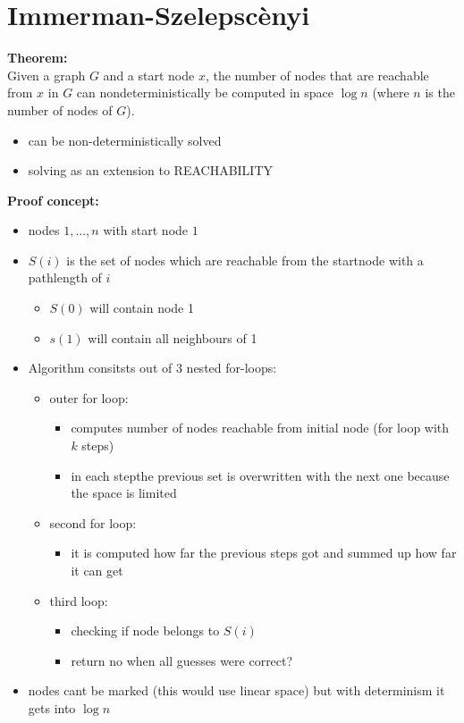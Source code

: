 \documentclass[a4]{scrartcl}
\begin{document}
\section*{Immerman-Szelepscènyi}

\textbf{Theorem:} \\
Given a graph $G$ and a start node $x$, the number of nodes that are reachable from $x$ in $G$ can nondeterministically be computed in space
$\log n$ (where $n$ is the number of nodes of $G$).



\begin{itemize}
\item can be non-deterministically solved
\item solving as an extension to REACHABILITY
\end{itemize}

\textbf{Proof concept:}
\begin{itemize}
\item nodes $1,...,n$ with start node $1$
\item $S(i)$ is the set of nodes which are reachable from the startnode with a pathlength of $i$
\begin{itemize}
\item $S(0)$ will contain node 1
\item $s(1)$ will contain all neighbours of 1
\end{itemize}

\item Algorithm consitsts out of 3 nested for-loops:

\begin{itemize}
\item outer for loop:
\begin{itemize}
\item computes number of nodes reachable from initial node (for loop with $k$ steps)
\item in each stepthe previous set is overwritten with the next one because the space is limited
\end{itemize}

\item second for loop:
\begin{itemize}
\item it is computed how far the previous steps got and summed up how far it can get
\end{itemize}

\item third loop:
\begin{itemize}
\item checking if node belongs to $S(i)$
\item return no when all guesses were correct? 
\end{itemize}
\end{itemize}

\item nodes cant be marked (this would use linear space) but with determinism it gets into $\log n$ 


\end{itemize}
\end{document}
